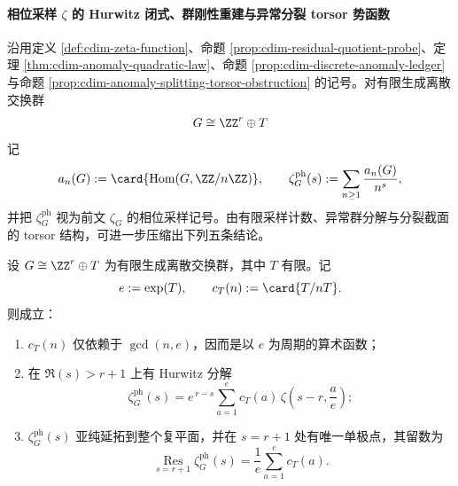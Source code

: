 \paragraph{相位采样 \texorpdfstring{$\zeta$}{zeta} 的 Hurwitz 闭式、群刚性重建与异常分裂 torsor 势函数}
沿用定义 \ref{def:cdim-zeta-function}、命题 \ref{prop:cdim-residual-quotient-probe}、定理 \ref{thm:cdim-anomaly-quadratic-law}、命题 \ref{prop:cdim-discrete-anomaly-ledger} 与命题 \ref{prop:cdim-anomaly-splitting-torsor-obstruction} 的记号。对有限生成离散交换群
\[
G\cong \ZZ^r\oplus T
\]
记
\[
a_n(G):=\card{\operatorname{Hom}(G,\ZZ/n\ZZ)},
\qquad
\zeta_G^{\mathrm{ph}}(s):=\sum_{n\ge 1}\frac{a_n(G)}{n^s},
\]
并把 \(\zeta_G^{\mathrm{ph}}\) 视为前文 \(\zeta_G\) 的相位采样记号。由有限采样计数、异常群分解与分裂截面的 torsor 结构，可进一步压缩出下列五条结论。

\begin{theorem}\label{thm:xi-time-part78-phase-zeta-hurwitz-pole}
设 \(G\cong \ZZ^r\oplus T\) 为有限生成离散交换群，其中 \(T\) 有限。记
\[
e:=\exp(T),
\qquad
c_T(n):=\card{T/nT}.
\]
则成立：
\begin{enumerate}
  \item \(c_T(n)\) 仅依赖于 \(\gcd(n,e)\)，因而是以 \(e\) 为周期的算术函数；
  \item 在 \(\Re(s)>r+1\) 上有 Hurwitz 分解
  \[
  \zeta_G^{\mathrm{ph}}(s)
  =e^{\,r-s}\sum_{a=1}^{e}c_T(a)\,\zeta\!\left(s-r,\frac{a}{e}\right);
  \]
  \item \(\zeta_G^{\mathrm{ph}}(s)\) 亚纯延拓到整个复平面，并在 \(s=r+1\) 处有唯一单极点，其留数为
  \[
  \operatorname*{Res}_{s=r+1}\zeta_G^{\mathrm{ph}}(s)
  =\frac{1}{e}\sum_{a=1}^{e}c_T(a).
  \]
\end{enumerate}
\end{theorem}
